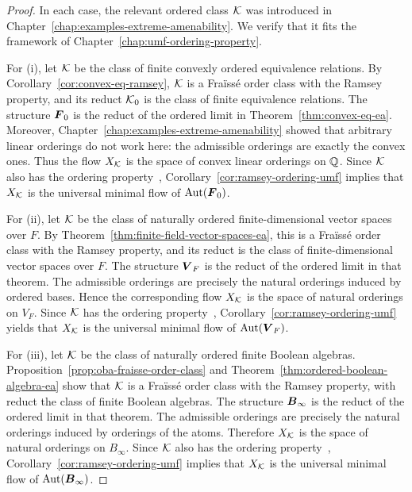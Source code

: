 \begin{proof}
In each case, the relevant ordered class \(\mathcal{K}\) was introduced in Chapter~\ref{chap:examples-extreme-amenability}. We verify that it fits the framework of Chapter~\ref{chap:umf-ordering-property}.

For (i), let \(\mathcal{K}\) be the class of finite convexly ordered equivalence relations. By Corollary~\ref{cor:convex-eq-ramsey}, \(\mathcal{K}\) is a Fraïssé order class with the Ramsey property, and its reduct \(\mathcal{K}_0\) is the class of finite equivalence relations. The structure \(\boldsymbol{F}_0\) is the reduct of the ordered limit in Theorem~\ref{thm:convex-eq-ea}. Moreover, Chapter~\ref{chap:examples-extreme-amenability} showed that arbitrary linear orderings do not work here: the admissible orderings are exactly the convex ones. Thus the flow \(X_{\mathcal{K}}\) is the space of convex linear orderings on \(\mathbb{Q}\). Since \(\mathcal{K}\) also has the ordering property~\cite{KPT05}, Corollary~\ref{cor:ramsey-ordering-umf} implies that \(X_{\mathcal{K}}\) is the universal minimal flow of \(\operatorname{Aut}(\boldsymbol{F}_0)\).

For (ii), let \(\mathcal{K}\) be the class of naturally ordered finite-dimensional vector spaces over \(F\). By Theorem~\ref{thm:finite-field-vector-spaces-ea}, this is a Fraïssé order class with the Ramsey property, and its reduct is the class of finite-dimensional vector spaces over \(F\). The structure \(\boldsymbol{V}_F\) is the reduct of the ordered limit in that theorem. The admissible orderings are precisely the natural orderings induced by ordered bases. Hence the corresponding flow \(X_{\mathcal{K}}\) is the space of natural orderings on \(V_F\). Since \(\mathcal{K}\) has the ordering property~\cite{KPT05}, Corollary~\ref{cor:ramsey-ordering-umf} yields that \(X_{\mathcal{K}}\) is the universal minimal flow of \(\operatorname{Aut}(\boldsymbol{V}_F)\).

For (iii), let \(\mathcal{K}\) be the class of naturally ordered finite Boolean algebras. Proposition~\ref{prop:oba-fraisse-order-class} and Theorem~\ref{thm:ordered-boolean-algebra-ea} show that \(\mathcal{K}\) is a Fraïssé order class with the Ramsey property, with reduct the class of finite Boolean algebras. The structure \(\boldsymbol{B}_\infty\) is the reduct of the ordered limit in that theorem. The admissible orderings are precisely the natural orderings induced by orderings of the atoms. Therefore \(X_{\mathcal{K}}\) is the space of natural orderings on \(B_\infty\). Since \(\mathcal{K}\) also has the ordering property~\cite{KPT05}, Corollary~\ref{cor:ramsey-ordering-umf} implies that \(X_{\mathcal{K}}\) is the universal minimal flow of \(\operatorname{Aut}(\boldsymbol{B}_\infty)\).
\end{proof}


